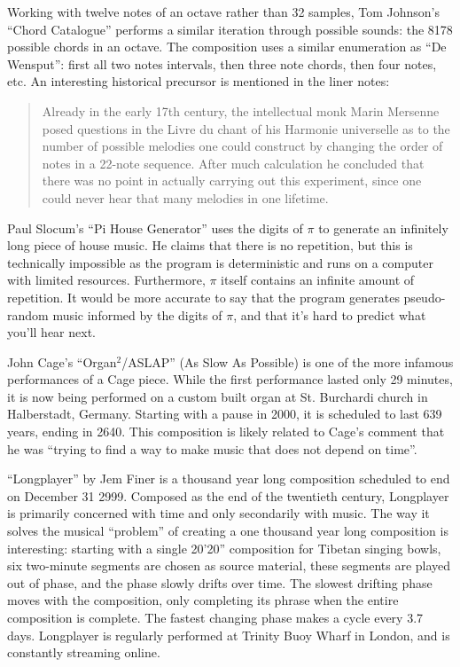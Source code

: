 \documentclass{thesis}
\begin{document}
	Working with twelve notes of an octave rather than 32 samples, Tom Johnson's ``Chord Catalogue''\cite{tom_johnson_liner_1999} performs a similar iteration through possible sounds: the 8178 possible chords in an octave. The composition uses a similar enumeration as ``De Wensput'': first all two notes intervals, then three note chords, then four notes, etc. An interesting historical precursor is mentioned in the liner notes:
	
	\begin{quote}
	Already in the early 17th century, the intellectual monk Marin Mersenne posed questions in the Livre du chant of his Harmonie universelle as to the number of possible melodies one could construct by changing the order of notes in a 22-note sequence. After much calculation he concluded that there was no point in actually carrying out this experiment, since one could never hear that many melodies in one lifetime.
	\end{quote}
		
	Paul Slocum's ``Pi House Generator''\cite{paul_slocum_pi_2007} uses the digits of $\pi$ to generate an infinitely long piece of house music. He claims that there is no repetition, but this is technically impossible as the program is deterministic and runs on a computer with limited resources. Furthermore, $\pi$ itself contains an infinite amount of repetition. It would be more accurate to say that the program generates pseudo-random music informed by the digits of $\pi$, and that it's hard to predict what you'll hear next.
	
	John Cage's ``Organ$^2$/ASLAP'' (As Slow As Possible)\cite{john_cage_as_????} is one of the more infamous performances of a Cage piece. While the first performance lasted only 29 minutes, it is now being performed on a custom built organ at St. Burchardi church in Halberstadt, Germany. Starting with a pause in 2000, it is scheduled to last 639 years, ending in 2640. This composition is likely related to Cage's comment that he was ``trying to find a way to make music that does not depend on time''.
	
	``Longplayer'' by Jem Finer\cite{jem_finer_longplayer_????} is a thousand year long composition scheduled to end on December 31 2999. Composed as the end of the twentieth century, Longplayer is primarily concerned with time and only secondarily with music. The way it solves the musical ``problem'' of creating a one thousand year long composition is interesting: starting with a single 20'20'' composition for Tibetan singing bowls, six two-minute segments are chosen as source material, these segments are played out of phase, and the phase slowly drifts over time. The slowest drifting phase moves with the composition, only completing its phrase when the entire composition is complete. The fastest changing phase makes a cycle every 3.7 days. Longplayer is regularly performed at Trinity Buoy Wharf in London, and is constantly streaming online.
	
\end{document}
